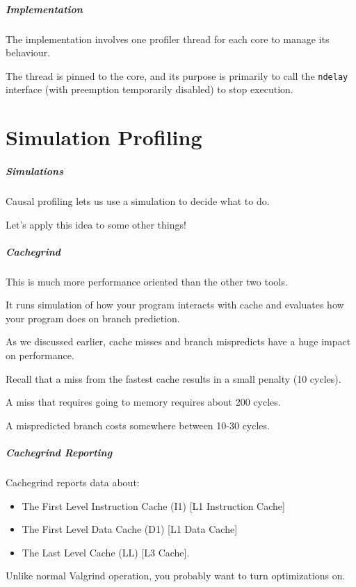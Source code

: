 \begin{frame}
\frametitle{Implementation}

The implementation involves one profiler thread for each core to manage its behaviour. 

The thread is pinned to the core, and its purpose is primarily to call the \texttt{ndelay} interface (with preemption temporarily disabled) to stop execution.

\end{frame}

\part{Simulation Profiling}

\begin{frame}
	\partpage
\end{frame}

\begin{frame}
\frametitle{Simulations}

Causal profiling lets us use a simulation to decide what to do.

Let's apply this idea to some other things!

\end{frame}

\begin{frame}
\frametitle{Cachegrind}

This is much more performance oriented than the other two tools. 

 It runs simulation of how your program interacts with cache and evaluates how your program does on branch prediction.
 
 As we discussed earlier, cache misses and branch mispredicts have a huge impact on performance.
 
 Recall that a miss from the fastest cache results in a small penalty (10 cycles).
 
 A miss that requires going to memory requires about 200 cycles. 
 
 A mispredicted branch costs somewhere between 10-30 cycles.


\end{frame}

\begin{frame}
\frametitle{Cachegrind Reporting}

Cachegrind reports data about:
\begin{itemize}
	\item The First Level Instruction Cache (I1) [L1 Instruction Cache]
	\item The First Level Data Cache (D1) [L1 Data Cache]
	\item The Last Level Cache (LL) [L3 Cache].
\end{itemize}

Unlike normal Valgrind operation, you probably want to turn optimizations on.

\end{frame}

